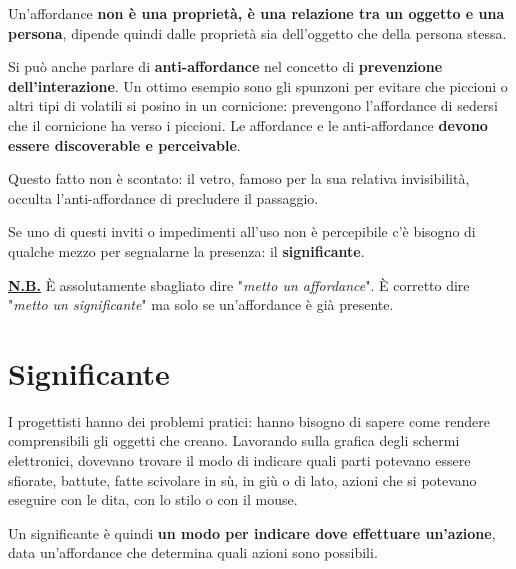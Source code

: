 Un'affordance \textbf{non è una proprietà, è una relazione tra un oggetto e una persona}, dipende quindi dalle proprietà sia dell'oggetto che della persona stessa.

Si può anche parlare di \textbf{anti-affordance} nel concetto di \textbf{prevenzione dell'interazione}. Un ottimo esempio sono gli spunzoni per evitare che piccioni o altri tipi di volatili si posino in un cornicione: prevengono l'affordance di sedersi che il cornicione ha verso i piccioni.
Le affordance e le anti-affordance \textbf{devono essere discoverable e perceivable}.

\pagebreak

Questo fatto non è scontato: il vetro, famoso per la sua relativa invisibilità, occulta l'anti-affordance di precludere il passaggio.

Se uno di questi inviti o impedimenti all'uso non è percepibile c'è bisogno di qualche mezzo per segnalarne la presenza: il \textbf{significante}.

\textbf{\underline{N.B.}} È assolutamente sbagliato dire "\textit{metto un affordance}". È corretto dire "\textit{metto un significante}" ma solo se un'affordance è già presente.

\section{Significante}
I progettisti hanno dei problemi pratici: hanno bisogno di sapere come rendere comprensibili gli oggetti che creano. Lavorando sulla grafica degli schermi elettronici, dovevano trovare il modo di indicare quali parti potevano essere sfiorate, battute, fatte scivolare in sù, in giù o di lato, azioni che si potevano eseguire con le dita, con lo stilo o con il mouse.

Un significante è quindi \textbf{un modo per indicare dove effettuare un'azione}, data un'affordance che determina quali azioni sono possibili.

